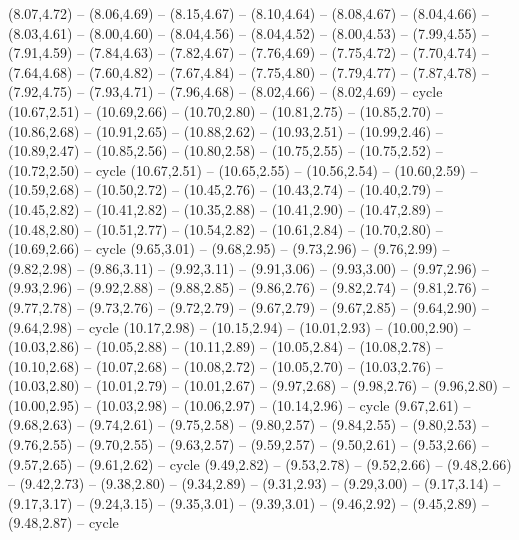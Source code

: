 \expandafter\def\csname geo:gebiet:UZB\endcsname{
  (8.07,4.72) -- (8.06,4.69) -- (8.15,4.67) -- (8.10,4.64) -- (8.08,4.67) -- (8.04,4.66) -- (8.03,4.61) -- (8.00,4.60) -- (8.04,4.56) -- (8.04,4.52) -- (8.00,4.53) -- (7.99,4.55) -- (7.91,4.59) -- (7.84,4.63) -- (7.82,4.67) -- (7.76,4.69) -- (7.75,4.72) -- (7.70,4.74) -- (7.64,4.68) -- (7.60,4.82) -- (7.67,4.84) -- (7.75,4.80) -- (7.79,4.77) -- (7.87,4.78) -- (7.92,4.75) -- (7.93,4.71) -- (7.96,4.68) -- (8.02,4.66) -- (8.02,4.69) -- cycle}
\expandafter\def\csname geo:gebiet:PNG\endcsname{
  (10.67,2.51) -- (10.69,2.66) -- (10.70,2.80) -- (10.81,2.75) -- (10.85,2.70) -- (10.86,2.68) -- (10.91,2.65) -- (10.88,2.62) -- (10.93,2.51) -- (10.99,2.46) -- (10.89,2.47) -- (10.85,2.56) -- (10.80,2.58) -- (10.75,2.55) -- (10.75,2.52) -- (10.72,2.50) -- cycle}
\expandafter\def\csname geo:gebiet:IDN\endcsname{
  (10.67,2.51) -- (10.65,2.55) -- (10.56,2.54) -- (10.60,2.59) -- (10.59,2.68) -- (10.50,2.72) -- (10.45,2.76) -- (10.43,2.74) -- (10.40,2.79) -- (10.45,2.82) -- (10.41,2.82) -- (10.35,2.88) -- (10.41,2.90) -- (10.47,2.89) -- (10.48,2.80) -- (10.51,2.77) -- (10.54,2.82) -- (10.61,2.84) -- (10.70,2.80) -- (10.69,2.66) -- cycle
  (9.65,3.01) -- (9.68,2.95) -- (9.73,2.96) -- (9.76,2.99) -- (9.82,2.98) -- (9.86,3.11) -- (9.92,3.11) -- (9.91,3.06) -- (9.93,3.00) -- (9.97,2.96) -- (9.93,2.96) -- (9.92,2.88) -- (9.88,2.85) -- (9.86,2.76) -- (9.82,2.74) -- (9.81,2.76) -- (9.77,2.78) -- (9.73,2.76) -- (9.72,2.79) -- (9.67,2.79) -- (9.67,2.85) -- (9.64,2.90) -- (9.64,2.98) -- cycle
  (10.17,2.98) -- (10.15,2.94) -- (10.01,2.93) -- (10.00,2.90) -- (10.03,2.86) -- (10.05,2.88) -- (10.11,2.89) -- (10.05,2.84) -- (10.08,2.78) -- (10.10,2.68) -- (10.07,2.68) -- (10.08,2.72) -- (10.05,2.70) -- (10.03,2.76) -- (10.03,2.80) -- (10.01,2.79) -- (10.01,2.67) -- (9.97,2.68) -- (9.98,2.76) -- (9.96,2.80) -- (10.00,2.95) -- (10.03,2.98) -- (10.06,2.97) -- (10.14,2.96) -- cycle
  (9.67,2.61) -- (9.68,2.63) -- (9.74,2.61) -- (9.75,2.58) -- (9.80,2.57) -- (9.84,2.55) -- (9.80,2.53) -- (9.76,2.55) -- (9.70,2.55) -- (9.63,2.57) -- (9.59,2.57) -- (9.50,2.61) -- (9.53,2.66) -- (9.57,2.65) -- (9.61,2.62) -- cycle
  (9.49,2.82) -- (9.53,2.78) -- (9.52,2.66) -- (9.48,2.66) -- (9.42,2.73) -- (9.38,2.80) -- (9.34,2.89) -- (9.31,2.93) -- (9.29,3.00) -- (9.17,3.14) -- (9.17,3.17) -- (9.24,3.15) -- (9.35,3.01) -- (9.39,3.01) -- (9.46,2.92) -- (9.45,2.89) -- (9.48,2.87) -- cycle}
